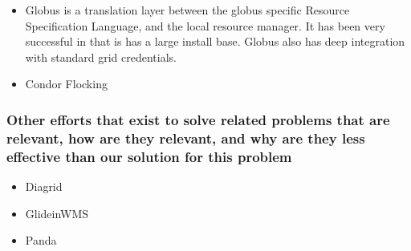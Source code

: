 \documentclass[11pt]{article}
\begin{document}
\begin{itemize}
\item
Globus is a translation layer between the globus specific Resource Specification Language, and the local resource manager.  It has been very successful in that is has a large install base.  Globus also has deep integration with standard grid credentials.

\item
Condor Flocking





\end{itemize}


\subsubsection*{Other efforts that exist to solve related problems that are
relevant, how are they relevant, and why are they less effective than our
solution for this problem}

\begin{itemize}

\item
Diagrid

\item 
GlideinWMS

\item
Panda


\end{itemize}
\end{document}
